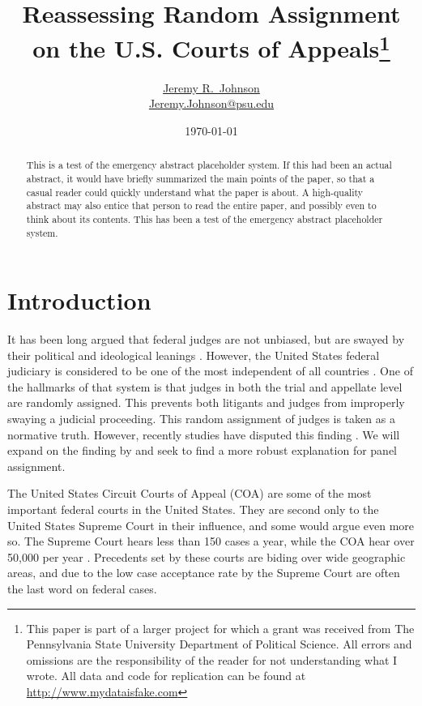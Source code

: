 \documentclass[12pt]{article}
\title{Reassessing Random Assignment on the U.S. Courts of Appeals\footnote{This paper is part of a larger project for which a grant was received from The Pennsylvania State University Department of Political Science.  All errors and omissions are the responsibility of the reader for not understanding what I wrote.  All data and code for replication can be found at \url{http://www.mydataisfake.com} } }
\author{\href{http://www.jeremyrjohnson.org/}{Jeremy R.\ Johnson}\\ \href{mailto:Jeremy.Johnson@psu.edu}{Jeremy.Johnson@psu.edu}}
\affil{Pennsylvania State University}
\date{\today}
\begin{document}
\clearpage\maketitle\thispagestyle{empty}


\begin{abstract}
	\medskip
	This is a test of the emergency abstract placeholder system.  If this had been an actual abstract, it would have briefly summarized the main points of the paper, so that a casual reader could quickly understand what the paper is about.  A high-quality abstract may also entice that person to read the entire paper, and possibly even to think about its contents.  This has been a test of the emergency abstract placeholder system. \\
\end{abstract}

\clearpage
\setcounter{page}{1}
\setcounter{footnote}{0}
\renewcommand*{\thefootnote}{\arabic{footnote}}
\addtolength{\footnotesep}{6pt}

\doublespacing
\section{Introduction}
It has been long argued that federal judges are not unbiased, but are swayed by their political and ideological leanings \citep{segal2002supreme}.  However, the United States federal judiciary is considered to be one of the most independent of all countries \citep{Linzer2014}.  One of the hallmarks of that system is that judges in both the trial and appellate level are randomly assigned.  This prevents both litigants and judges from improperly swaying a judicial proceeding.  This random assignment of judges is taken as a normative truth.  However, recently studies have disputed this finding \citep{Chilton2014}.  We will expand on the finding by \citeauthor{Chilton2014} and seek to find a more robust explanation for panel assignment.

The United States Circuit Courts of Appeal (COA) are some of the most important federal courts in the United States.  They are second only to the United States Supreme Court in their influence, and some would argue even more so.  The Supreme Court hears less than 150 cases a year, while the COA hear over 50,000 per year \citep{Caseloadstats}.  Precedents set by these courts are biding over wide geographic areas, and due to the low case acceptance rate by the Supreme Court are often the last word on federal cases.
\end{document}
